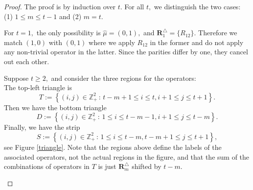 \documentclass[11pt]{amsart}
\begin{document}
\begin{proof} The proof is by induction over $t$. For all $t,$ we distinguish the two cases: (1) $1 \leq m \leq t-1$ and (2) $m=t$.

For $t=1,$ the only possibility is $\hat{\mu}=(0,1),$ and $\mathbf{R}^\triangle_1=\{R_{12}\}.$ Therefore we match $(1,0)$ with $(0,1)$ where we apply $R_{12}$ in the former and do not apply any non-trivial operator in the latter. Since the parities differ by one, they cancel out each other. 

Suppose $t\geq 2,$  and consider the three regions for the operators:\\
The top-left triangle is 
\[T:= \left\{ (i,j) \in \mathbb{Z}^2_{+} \, : \,  t-m+1 \leq i \leq t , i+1 \leq j \leq t+1 \right\}.\]
Then we have the bottom triangle
\[D:= \left\{ (i,j) \in \mathbb{Z}^2_{+} \, : \,  1 \leq i \leq t-m-1 , i+1 \leq j \leq t-m \right\}.\]
Finally, we have the strip 
\[S:= \left\{ (i,j) \in \mathbb{Z}^2_{+} \, : \,  1 \leq i \leq t-m , t-m+1 \leq j \leq t+1 \right\},\]
see Figure \ref{triangle}. Note that the regions above define the labels of the associated operators, not the actual regions in the figure, and that the sum of the combinations of operators in $T$ is just $\mathbf{R}_{m}^{\triangle}$ shifted by $t-m$. 

\begin{figure} 
\end{figure}
\end{proof}
\end{document}
